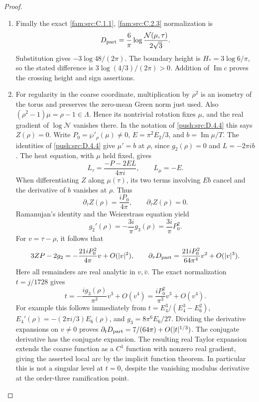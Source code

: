\begin{proof}
\begin{enumerate}[label=\arabic*.,leftmargin=*]
\item Finally the exact \cref{fam:src:C.1.1}, \cref{fam:src:C.2.3} normalization is
\[
 D_{\rm part}=\frac6\pi
          \log\frac{\mathcal N(\mu,\tau)}{2\sqrt3}.
\]
Substitution gives \(-3\log48/(2\pi)\). The boundary height is
\(H_*=3\log6/\pi\), so the stated difference is
\(3\log(4/3)/(2\pi)>0\). Addition of \(\operatorname{Im}c\)
proves the crossing height and sign assertions.

\item For regularity in the coarse coordinate, multiplication by \(\rho^2\) is an
isometry of the torus and preserves the zero-mean Green norm just
used. Also \((\rho^2-1)\mu=\rho-1\in\Lambda\). Hence its
nontrivial rotation fixes \(\mu\), and the real gradient of
\(\log\mathcal N\) vanishes there. In the notation of \ref{push:src:D.4.4} this
says \(Z(\rho)=0\). Write \(P_0=\wp'_\rho(\mu)\ne0\),
\(E=\pi^2E_2/3\), and \(b=\operatorname{Im}\mu/T\).
The identities of \ref{push:src:D.4.4} give \(\mu'=b\) at \(\rho\), since
\(g_2(\rho)=0\) and \(L=-2\pi ib\). The heat equation, with
\(\mu\) held fixed, gives
\[
 L_\tau=\frac{-P-2EL}{4\pi i},\qquad L_\mu=-E.
\]
When differentiating \(Z\) along \(\mu(\tau)\), its two terms
involving \(E b\) cancel and the derivative of \(b\) vanishes at
\(\rho\). Thus
\[
 \partial_\tau Z(\rho)=\frac{iP_0}{4\pi},\qquad
 \partial_{\bar\tau}Z(\rho)=0.
\]
Ramanujan's identity and the Weierstrass equation yield
\[
 g_2'(\rho)=-\frac{3i}{\pi}g_3(\rho)
            =\frac{3i}{\pi}P_0^2.
\]
For \(v=\tau-\rho\), it follows that
\[
 3ZP-2g_2=-\frac{21iP_0^2}{4\pi}v+O(|v|^2),\qquad
 \partial_\tau D_{\rm part}
       =\frac{21iP_0^2}{64\pi^4}v^2+O(|v|^3).
\]
Here all remainders are real analytic in \(v,\bar v\).
The exact normalization \(t=j/1728\) gives
\[
 t=-\frac{i g_3(\rho)}{\pi^3}v^3+O(v^4)
   =\frac{iP_0^2}{\pi^3}v^3+O(v^4).
\]
For example this follows immediately from
\(t=E_4^3/(E_4^3-E_6^2)\),
\(E_4'(\rho)=-(2\pi i/3)E_6(\rho)\), and
\(g_3=8\pi^6E_6/27\). Dividing the derivative expansions on
\(v\ne0\) proves
\(\partial_tD_{\rm part}=7/(64\pi)+O(|t|^{1/3})\).
The conjugate derivative has the conjugate expansion. The resulting
real Taylor expansion extends the coarse function as a \(C^1\)
function with nonzero real gradient, giving the asserted local arc
by the implicit function theorem. In particular this is not a
singular level at \(t=0\), despite the vanishing modulus derivative
at the order-three ramification point.

\end{enumerate}
\end{proof}
